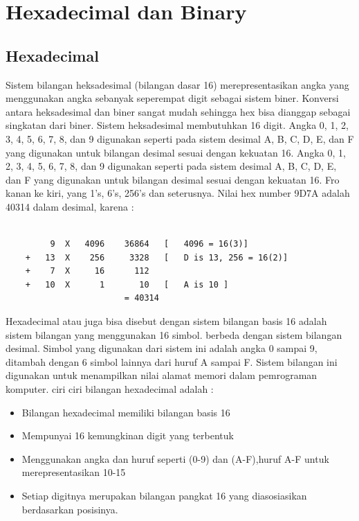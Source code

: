 
\section {Hexadecimal dan Binary}

	\subsection {Hexadecimal}
	Sistem bilangan heksadesimal (bilangan dasar 16) merepresentasikan angka yang menggunakan angka sebanyak seperempat digit sebagai sistem biner. Konversi antara heksadesimal dan biner sangat mudah sehingga hex bisa dianggap sebagai singkatan dari biner. Sistem heksadesimal membutuhkan 16 digit. Angka 0, 1, 2, 3, 4, 5, 6, 7, 8, dan 9 digunakan seperti pada sistem desimal A, B, C, D, E, dan F yang digunakan untuk bilangan desimal sesuai dengan kekuatan 16. Angka 0, 1, 2, 3, 4, 5, 6, 7, 8, dan 9 digunakan seperti pada sistem desimal A, B, C, D, E, dan F yang digunakan untuk bilangan desimal sesuai dengan kekuatan 16. Fro kanan ke kiri, yang 1's, 6's, 256's dan seterusnya. Nilai hex number 9D7A adalah 40314 dalam desimal, karena \cite{detmer2001introduction}:
	\begin{verbatim}

		 9	X	4096	36864	[	4096 = 16(3)]
	+	13	X	 256	 3328	[	D is 13, 256 = 16(2)]
	+	 7	X	  16	  112
	+	10	X	   1	   10	[	A is 10	]
						= 40314
	\end{verbatim}
	
	Hexadecimal atau juga bisa disebut dengan sistem bilangan basis 16 adalah sistem bilangan yang menggunakan 16 simbol. berbeda dengan sistem bilangan desimal. Simbol yang digunakan dari sistem ini adalah angka 0 sampai 9, ditambah dengan 6 simbol lainnya dari huruf A sampai F. Sistem bilangan ini digunakan untuk menampilkan nilai alamat memori dalam pemrograman komputer.
	ciri ciri bilangan hexadecimal adalah :

	\begin{itemize}
		\item Bilangan hexadecimal memiliki bilangan basis 16
		\item Mempunyai 16 kemungkinan digit yang terbentuk
		\item Menggunakan angka dan huruf seperti (0-9) dan (A-F),huruf A-F untuk merepresentasikan 10-15
		\item Setiap digitnya merupakan bilangan pangkat 16 yang diasosiasikan berdasarkan posisinya.
	\end{itemize}

